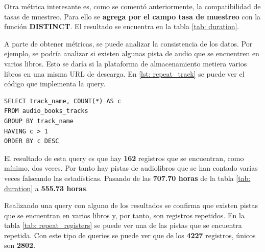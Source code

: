 Otra métrica interesante es, como se comentó anteriormente, la compatibilidad de tasas de muestreo. Para ello se \textbf{agrega por el campo tasa de muestreo} con la función \textbf{DISTINCT}. El resultado se encuentra en la tabla \ref{tab: duration}.

A parte de obtener métricas, se puede analizar la consistencia de los datos. Por ejemplo, se podría analizar si existen algunas pista de audio que se encuentren en varios libros. Esto se daría si la plataforma de almacenamiento metiera varios libros en una misma \gls{URL} de descarga. En \ref{lst: repeat_track} se puede ver el código que implementa la query.

\begin{lstlisting}[style=SQL,basicstyle=\tiny\ttfamily, caption={Query para obtener las pistas repetidas en varios libros},captionpos=b, label={lst: repeat_track}]
SELECT track_name, COUNT(*) AS c
FROM audio_books_tracks
GROUP BY track_name
HAVING c > 1
ORDER BY c DESC
\end{lstlisting}

El resultado de esta query es que hay \textbf{162} registros que se encuentran, como mínimo, dos veces. Por tanto hay pistas de audiolibros que se han contado varias veces falseando las estadísticas. Pasando de las \textbf{707.70 horas} de la tabla \ref{tab: duration} a \textbf{555.73 horas}.

Realizando una query con alguno de los resultados se confirma que existen pistas que se encuentran en varios libros y, por tanto, son registros repetidos. En la tabla \ref{tab: repeat_registers} se puede ver una de las pistas que se encuentra repetida. Con este tipo de queries se puede ver que de los \textbf{4227} registros, únicos son \textbf{2802}.
\begin{table} [h!]
	\centering
	\vspace*{3pt}
	\caption{Ejemplo de registros repetidos}\label{tab: repeat_registers}
\end{table}

